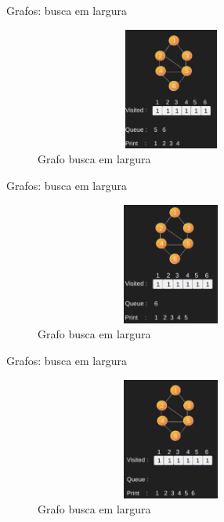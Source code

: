 \begin{frame}
	\begin{block}{Grafos: busca em largura}
		\begin{figure}[!htb]
			\centering	  
			\includegraphics[height=4cm, width = 9cm]{./pic/bfs9.png}
			\caption{Grafo busca em largura}
		\end{figure}
	\end{block}
\end{frame}

\begin{frame}
	\begin{block}{Grafos: busca em largura}
		\begin{figure}[!htb]
			\centering	  
			\includegraphics[height=4cm, width = 9cm]{./pic/bfs10.png}
			\caption{Grafo busca em largura}
		\end{figure}
	\end{block}
\end{frame}

\begin{frame}
	\begin{block}{Grafos: busca em largura}
		\begin{figure}[!htb]
			\centering	  
			\includegraphics[height=4cm, width = 9cm]{./pic/bfs11.png}
			\caption{Grafo busca em largura}
		\end{figure}
	\end{block}
\end{frame}

